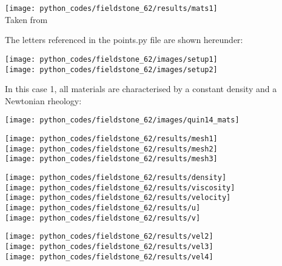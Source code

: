 \begin{center}
\texttt{[image: python\_codes/fieldstone\_62/results/mats1]}\\
{\captionfont Taken from \cite{quin14}}
\end{center}

The letters referenced in the {points.py} file are shown hereunder:

\begin{center}
\texttt{[image: python\_codes/fieldstone\_62/images/setup1]}\\
\texttt{[image: python\_codes/fieldstone\_62/images/setup2]}
\end{center}


In this case 1, all materials are characterised by a constant density and a Newtonian rheology:
\begin{center}
\texttt{[image: python\_codes/fieldstone\_62/images/quin14\_mats]}
\end{center}

\newpage
\begin{center}
\texttt{[image: python\_codes/fieldstone\_62/results/mesh1]}\\
\texttt{[image: python\_codes/fieldstone\_62/results/mesh2]}\\
\texttt{[image: python\_codes/fieldstone\_62/results/mesh3]}
\end{center}

\newpage
\begin{center}
\texttt{[image: python\_codes/fieldstone\_62/results/density]}\\
\texttt{[image: python\_codes/fieldstone\_62/results/viscosity]}\\
\texttt{[image: python\_codes/fieldstone\_62/results/velocity]}\\
\texttt{[image: python\_codes/fieldstone\_62/results/u]}\\
\texttt{[image: python\_codes/fieldstone\_62/results/v]}\\
\end{center}

\newpage
\begin{center}
\texttt{[image: python\_codes/fieldstone\_62/results/vel2]}\\
\texttt{[image: python\_codes/fieldstone\_62/results/vel3]}\\
\texttt{[image: python\_codes/fieldstone\_62/results/vel4]}
\end{center}

